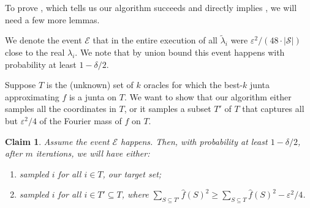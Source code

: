 \documentclass[10pt,a4paper]{article}
\theoremstyle{plain}
\newtheorem{claim}[theorem]{Claim}
\theoremstyle{remark}
\theoremstyle{plain}
\newcommand{\eps}{\varepsilon}
\renewcommand{\hat}{\widehat}
\renewcommand{\tilde}{\widetilde}
\newcommand{\calE}{\mathcal{E}}
\newcommand{\calS}{\mathcal{S}}
\newcommand{\InfluentialCoords}{\calS}
\renewcommand{\epsilon}{\varepsilon}
\begin{document}
To prove , which tells us our algorithm succeeds and directly implies , we will need a few more lemmas.


We denote the event $\calE$ that in the entire execution of  all $\tilde{\lambda}_i$ were $\eps^2/(48\cdot |\InfluentialCoords|)$ close to the real $\lambda_i$.
We note that by union bound this event happens with probability at least $1-\delta/2$.


Suppose $T$ is the (unknown) set of $k$ oracles for which the best-$k$ junta approximating $f$ is a junta on $T$. We want to show that our algorithm either samples all the coordinates in $T$, or it samples a subset $T'$ of $T$ that captures all but $\eps^2/4$ of the Fourier mass of $f$ on $T$.

\begin{claim}
\label{claim:Sprime-correctness}
Assume the event $\calE$ happens. Then, with probability at least $1-\delta/2$, after $m$ iterations, we will have either:
 \begin{enumerate}
     \item sampled $i$ for all $i\in T$, our target set;
     \item sampled $i$ for all $i \in T' \subseteq T$, where 
     $\sum_{S \subseteq T'} \hat{f}(S)^2 \geq \sum_{S \subseteq T} \hat{f}(S)^2 - \epsilon^2/4$. 
 \end{enumerate}
\end{claim}
\end{document}
